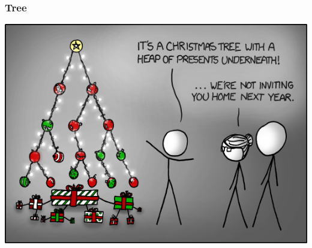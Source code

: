 \begin{frame}
	\frametitle{Tree}
	\begin{center}
		\includegraphics[width=\textwidth,height=\textheight,keepaspectratio]{images/tree}
	\end{center}
\end{frame}


